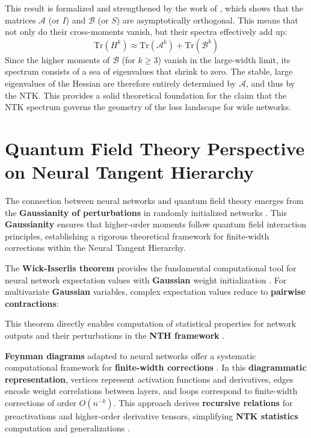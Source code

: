 \documentclass[a4paper]{article}
\theoremstyle{plain}
\theoremstyle{definition}
\theoremstyle{remark}
\begin{document}
This result is formalized and strengthened by the work of \cite{jacot2020kernelhessian}, which shows that the matrices $\mathcal{A}$ (or $I$) and $\mathcal{B}$ (or $S$) are asymptotically orthogonal. This means that not only do their cross-moments vanish, but their spectra effectively add up:
\begin{equation}
\mathrm{Tr}(H^k) \approx \mathrm{Tr}(\mathcal{A}^k) + \mathrm{Tr}(\mathcal{B}^k)
\end{equation}
Since the higher moments of $\mathcal{B}$ (for $k \ge 3$) vanish in the large-width limit, its spectrum consists of a sea of eigenvalues that shrink to zero. The stable, large eigenvalues of the Hessian are therefore entirely determined by $\mathcal{A}$, and thus by the NTK. This provides a solid theoretical foundation for the claim that the NTK spectrum governs the geometry of the loss landscape for wide networks.











\section{Quantum Field Theory Perspective on Neural Tangent Hierarchy}

The connection between neural networks and quantum field theory emerges from the \textbf{Gaussianity of perturbations} in randomly initialized networks \cite{halverson2020neural, bondesan2021hintons}. This \textbf{Gaussianity} ensures that higher-order moments follow quantum field interaction principles, establishing a rigorous theoretical framework for finite-width corrections within the Neural Tangent Hierarchy.

The \textbf{Wick-Isserlis theorem} provides the fundamental computational tool for neural network expectation values with \textbf{Gaussian} weight initialization \cite{grosvenor2021edge}. For multivariate \textbf{Gaussian} variables, complex expectation values reduce to \textbf{pairwise contractions}:

This theorem directly enables computation of statistical properties for network outputs and their perturbations in the \textbf{NTH framework} \cite{yaida2023structures}.

\textbf{Feynman diagrams} adapted to neural networks offer a systematic computational framework for \textbf{finite-width corrections} \cite{guillen_misof_gerken_2025, mei2021principles}. In this \textbf{diagrammatic representation}, vertices represent activation functions and derivatives, edges encode weight correlations between layers, and loops correspond to finite-width corrections of order $O(n^{-k})$. This approach derives \textbf{recursive relations} for preactivations and higher-order derivative tensors, simplifying \textbf{NTK statistics} computation and generalizations \cite{erbin2022renormalization}.
\end{document}
